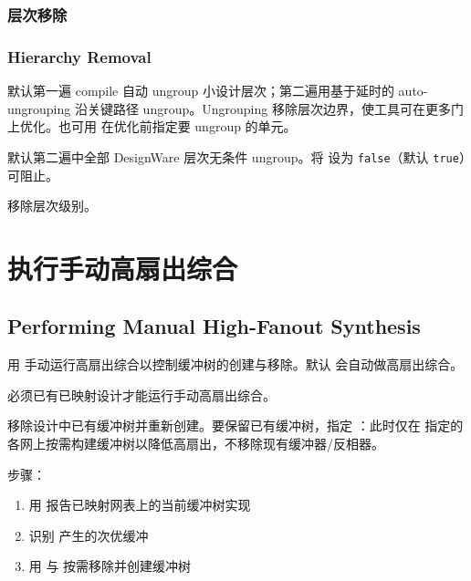 \subsubsection{层次移除}
\subsubsection*{Hierarchy Removal}

默认第一遍 compile 自动 ungroup 小设计层次；第二遍用基于延时的 auto-ungrouping 沿关键路径 ungroup。Ungrouping 移除层次边界，使工具可在更多门上优化。也可用  在优化前指定要 ungroup 的单元。

默认第二遍中全部 DesignWare 层次无条件 ungroup。将  设为 \texttt{false}（默认 \texttt{true}）可阻止。

\begin{seeAlsoBox}
移除层次级别。
\end{seeAlsoBox}

\section{执行手动高扇出综合}
\subsection*{Performing Manual High-Fanout Synthesis}

用  手动运行高扇出综合以控制缓冲树的创建与移除。默认  会自动做高扇出综合。

\begin{noteBox}
必须已有已映射设计才能运行手动高扇出综合。
\end{noteBox}

 移除设计中已有缓冲树并重新创建。要保留已有缓冲树，指定 ：此时仅在  指定的各网上按需构建缓冲树以降低高扇出，不移除现有缓冲器/反相器。

步骤：
\begin{enumerate}
  \item 用  报告已映射网表上的当前缓冲树实现
  \item 识别  产生的次优缓冲
  \item 用  与  按需移除并创建缓冲树
\end{enumerate}

